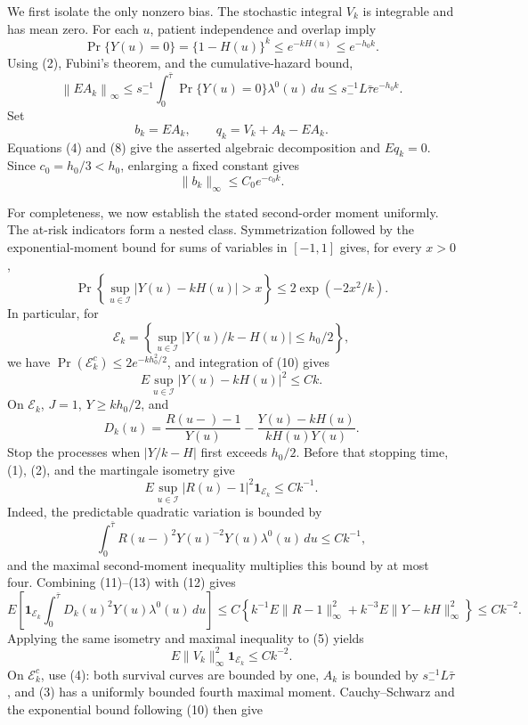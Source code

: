 We first isolate the only nonzero bias.  The stochastic integral \(V_k\) is integrable and has mean zero.  For each \(u\), patient independence and overlap imply
\[
 \Pr\{Y(u)=0\}=\{1-H(u)\}^k
 \le e^{-kH(u)}\le e^{-h_0k}.                                \tag{6}
\]
Using (2), Fubini's theorem, and the cumulative-hazard bound,
\[
 \left\|EA_k\right\|_\infty
 \le s_-^{-1}\int_0^{\bar\tau}\Pr\{Y(u)=0\}\lambda^0(u)\,du
 \le s_-^{-1}L\bar\tau e^{-h_0k}.                            \tag{7}
\]
Set
\[
 b_k=EA_k,\qquad q_k=V_k+A_k-EA_k.                             \tag{8}
\]
Equations (4) and (8) give the asserted algebraic decomposition and \(Eq_k=0\).  Since \(c_0=h_0/3<h_0\), enlarging a fixed constant gives
\[
 \|b_k\|_\infty\le C_0e^{-c_0k}.                            \tag{9}
\]

For completeness, we now establish the stated second-order moment uniformly.  The at-risk indicators form a nested class.  Symmetrization followed by the exponential-moment bound for sums of variables in \([-1,1]\) gives, for every \(x>0\),
\[
 \Pr\left\{\sup_{u\in\mathcal I}|Y(u)-kH(u)|>x\right\}
 \le 2\exp(-2x^2/k).                                         \tag{10}
\]
In particular, for
\[
 \mathcal E_k=\left\{\sup_{u\in\mathcal I}|Y(u)/k-H(u)|
 \le h_0/2\right\},
\]
we have \(\Pr(\mathcal E_k^c)\le2e^{-kh_0^2/2}\), and integration of (10) gives
\[
 E\sup_{u\in\mathcal I}|Y(u)-kH(u)|^2\le Ck.                \tag{11}
\]
On \(\mathcal E_k\), \(J=1\), \(Y\ge kh_0/2\), and
\[
 D_k(u)=\frac{R(u-)-1}{Y(u)}
 -\frac{Y(u)-kH(u)}{kH(u)Y(u)}.                               \tag{12}
\]
Stop the processes when \(|Y/k-H|\) first exceeds \(h_0/2\).  Before that stopping time, (1), (2), and the martingale isometry give
\[
 E\sup_{u\in\mathcal I}|R(u)-1|^2\mathbf 1_{\mathcal E_k}
 \le Ck^{-1}.                                                 \tag{13}
\]
Indeed, the predictable quadratic variation is bounded by
\[
 \int_0^{\bar\tau}R(u-)^2Y(u)^{-2}Y(u)\lambda^0(u)\,du
 \le Ck^{-1},
\]
and the maximal second-moment inequality multiplies this bound by at most four.  Combining (11)--(13) with (12) gives
\[
 E\left[\mathbf 1_{\mathcal E_k}
 \int_0^{\bar\tau}D_k(u)^2Y(u)\lambda^0(u)\,du\right]
 \le C\left\{k^{-1}E\|R-1\|_\infty^2
       +k^{-3}E\|Y-kH\|_\infty^2\right\}
 \le Ck^{-2}.                                                 \tag{14}
\]
Applying the same isometry and maximal inequality to (5) yields
\[
 E\|V_k\|_\infty^2\mathbf 1_{\mathcal E_k}\le Ck^{-2}.      \tag{15}
\]
On \(\mathcal E_k^c\), use (4): both survival curves are bounded by one, \(A_k\) is bounded by \(s_-^{-1}L\bar\tau\), and (3) has a uniformly bounded fourth maximal moment.  Cauchy--Schwarz and the exponential bound following (10) then give
